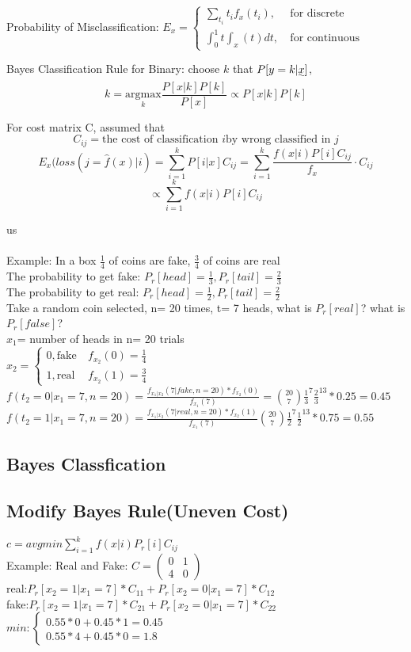 \documentclass{article}
\begin{document}
{    Probability of Misclassification: \(E_x= \begin{cases}
        \sum_{t_i}t_if_x(t_i), &\   \text{for discrete} \\
        \int_{0}^{1}t\int_{x}(t)dt, &\  \text{for continuous}
    \end{cases}\)

    Bayes Classification Rule for Binary: choose $k$ that $P[y=k|\uwave{x}]$,
    \[k= \underset{k}{\mathrm{argmax}}\frac{P[x|k]P[k]}{P[x]} \propto P[x|k]P[k]\]

    For cost matrix C, assumed that
    \[C_{ij}= \text{the cost of classification } i \text{by wrong classified in } j\]
    \[E_x(loss(j=\hat{f}(x)|i)= \sum_{i=1}^{k}P[i|x]C_{ij} = \sum_{i=1}^{k}\frac{f(x|i)P[i]C_{ij}}{f_x} \cdot C_{ij}\]
    \[ \propto \sum_{i=1}^{k}f(x|i)P[i]C_{ij}\]
}

us 
\\
\\Example: In a box $\frac{1}{4}$ of coins are fake, $\frac{3}{4} $ of coins are real
\\The probability to get fake: $P_r[head]= \frac{1}{3}, P_r[tail]= \frac{2}{3} $
\\The probability to get real: $P_r[head]= \frac{1}{2}, P_r[tail]= \frac{2}{2} $
\\Take a random coin selected, n= 20 times, t= 7 heads, what is $P_r[real]$? what is $P_r[false]$?
\\$x_1$= number of heads in n= 20 trials
\\$x_2= \begin{cases} 0, \text{fake}  &\  f_{x_2}(0)=\frac{1}{4} \\ 
	1, \text{real}  &\  f_{x_2}(1)=\frac{3}{4} \end{cases}$
\\$f(t_2= 0| x_1=7, n= 20)=\frac{f_{x_1|x_2}(7|fake, n= 20)*f_{x_2}(0)}{f_{x_1}(7)}= {20\choose 7}\frac{1}{3}^7\frac{2}{3}^13*0.25=0.45$
\\$f(t_2= 1|x_1=7, n= 20)=\frac{ f_{x_1|x_2}(7|real, n= 20)*f_{x_2}(1)}{f_{x_1}(7)}{20\choose 7}\frac{1}{2}^7\frac{1}{2}^13*0.75=0.55$	

\subsection{Bayes Classfication} 	

\subsection{Modify Bayes Rule(Uneven Cost)} 
$c= avgmin\sum_{i=1}^{k}f(x|i)P_r[i]C_{ij}$
\\Example: Real and Fake: $C=\begin{pmatrix} 0 & 1 \\ 4 & 0 \end{pmatrix}$
\\real:$P_r[x_2=1|x_1=7]*C_{11}+P_r[x_2=0|x_1=7]*C_{12}$
\\fake:$P_r[x_2=1|x_1=7]*C_{21}+P_r[x_2=0|x_1=7]*C_{22}$
\\$min:\begin{cases} 0.55*0+0.45*1=0.45 \\ 
	0.55*4+0.45*0=1.8 \end{cases}$
\end{document}
